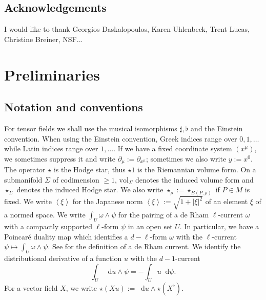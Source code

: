\documentclass[reqno,10pt]{amsart}
\newcommand*\dif{\mathop{}\!\mathrm{d}}
\newcommand{\vol}{\mathrm{vol}}
\def\Japan#1{\left \langle #1 \right \rangle}
\theoremstyle{definition}
\numberwithin{equation}{section}
\begin{document}
\subsection{Acknowledgements}
I would like to thank Georgios Daskalopoulos, Karen Uhlenbeck, Trent Lucas, Christine Breiner, NSF...


\section{Preliminaries}\label{prelims}
\subsection{Notation and conventions}
For tensor fields we shall use the musical isomorphisms $\sharp, \flat$ and the Einstein convention.
When using the Einstein convention, Greek indices range over $0, 1, \dots$ while Latin indices range over $1, \dots$.
If we have a fixed coordinate system $(x^\mu)$, we sometimes suppress it and write $\partial_\mu := \partial_{x^\mu}$; sometimes we also write $y := x^0$.
The operator $\star$ is the Hodge star, thus $\star 1$ is the Riemannian volume form.
On a submanifold $\Sigma$ of codimension $\geq 1$, $\vol_\Sigma$ denotes the induced volume form and $\star_\Sigma$ denotes the induced Hodge star. We also write $\star_\rho := \star_{B(P, \rho)}$ if $P \in M$ is fixed.
We write $\Japan\xi$ for the Japanese norm $\Japan\xi := \sqrt{1 + |\xi|^2}$
of an element $\xi$ of a normed space.
We write $\int_U \omega \wedge \psi$ for the pairing of a de Rham $\ell$-current $\omega$ with a compactly supported $\ell$-form $\psi$ in an open set $U$.
In particular, we have a Poincar\'e duality map which identifies a $d - \ell$-form $\omega$ with the $\ell$-current $\psi \mapsto \int_U \omega \wedge \psi$.
See \cite{simon1983GMT} for the definition of a de Rham current.
We identify the distributional derivative of a function $u$ with the $d-1$-current
$$\int_U \dif u \wedge \psi = -\int_U u \dif \psi.$$
For a vector field $X$, we write $\star (Xu) := \dif u \wedge \star (X^\flat)$.


\end{document}
